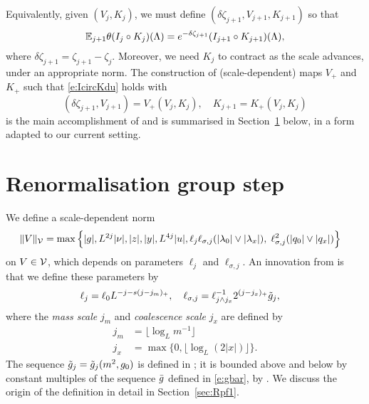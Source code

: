 Equivalently, given $(V_j, K_j)$, we must define $(\delta\zeta_{j+1}, V_{j+1}, K_{j+1})$ so that
\begin{equation} \label{e:IcircKdu}
	\mathbb{E}_{j+1}\theta(I_j \circ K_j)(\Lambda)
	=
	e^{-\delta \zeta_{j+1}}(I_{j+1} \circ K_{j+1})(\Lambda),
\end{equation}
where $\delta\zeta_{j+1} = \zeta_{j+1} - \zeta_j$.
Moreover, we need $K_j$ to contract as the scale advances, under an appropriate norm.
The construction of (scale-dependent) maps $V_+$ and $K_+$ such that
\eqref{e:IcircKdu} holds with
\begin{equation}
(\delta\zeta_{j+1}, V_{j+1}) = V_+(V_j, K_j),
	\quad
K_{j+1} =  K_+(V_j, K_j)
\end{equation}
is the main accomplishment of \cite{BS-rg-step} and is summarised in Section~\ref{sec:step}
below, in a form adapted to our current setting.


\section{Renormalisation group step}
\label{sec:step}

We define a scale-dependent norm
\begin{equation}
\label{e:Vnormdef}
\begin{aligned}
\|V\|_{\mathcal{V}} &=
\max\Big\{
|g|, L^{2j}|\nu|, |z|, |y|,  L^{4j}|u|,
\ell_j\ell_{\sigma,j}(|\lambda_0|\vee|\lambda_x|),\;
 \ell_{\sigma,j}^{2} (|q_0|\vee|q_x|)
\Big\}
\end{aligned}
\end{equation}
on $V \in \mathcal{V}$, which depends on parameters $\ell_j$ and $\ell_{\sigma,j}$.
An innovation from \cite{BSTW-clp} is that we define these parameters by
\begin{align}
\label{e:elldef-zz}
\ell_j &= \ell_0 L^{-j - s (j - j_m)_+}, \quad
\ell_{\sigma,j}
=
\ell_{j \wedge j_{x}}^{-1} 2^{(j - j_{x})_+} \tilde{g}_j,
\end{align}
where the \emph{mass scale} $j_m$ and \emph{coalescence scale} $j_x$
are defined by
\begin{align}
\label{e:jmdef}
j_m		&= \lfloor\log_{L} m^{-1}\rfloor
	\\
\label{e:jxdef}
j_x 	&= \max\{0,\lfloor \log_{L} (2 |x|)\rfloor\}.
\end{align}
The sequence $\tilde{g}_j = \tilde{g}_j(m^2,g_0)$ is defined in
\cite[\eqref{log-e:ggendef}]{BBS-saw4-log};
it is bounded above and below by constant multiples of
the sequence $\bar{g}$ defined in
\eqref{e:gbar},
by
\cite[Lemma~\ref{log-lem:gbarmcomp}]{BBS-saw4-log}.
We discuss the origin of the definition  in detail
in Section~\ref{sec:Rpf1}.

